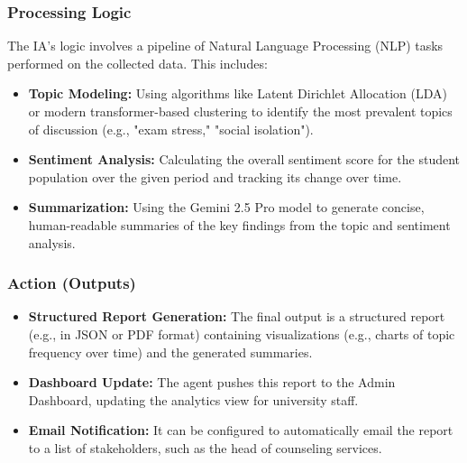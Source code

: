 \subsubsection{Processing Logic}
The IA's logic involves a pipeline of Natural Language Processing (NLP) tasks performed on the collected data. This includes:
\begin{itemize}
    \item \textbf{Topic Modeling:} Using algorithms like Latent Dirichlet Allocation (LDA) or modern transformer-based clustering to identify the most prevalent topics of discussion (e.g., "exam stress," "social isolation").
    \item \textbf{Sentiment Analysis:} Calculating the overall sentiment score for the student population over the given period and tracking its change over time.
    \item \textbf{Summarization:} Using the Gemini 2.5 Pro model to generate concise, human-readable summaries of the key findings from the topic and sentiment analysis.
\end{itemize}

\subsubsection{Action (Outputs)}
\begin{itemize}
    \item \textbf{Structured Report Generation:} The final output is a structured report (e.g., in JSON or PDF format) containing visualizations (e.g., charts of topic frequency over time) and the generated summaries.
    \item \textbf{Dashboard Update:} The agent pushes this report to the Admin Dashboard, updating the analytics view for university staff.
    \item \textbf{Email Notification:} It can be configured to automatically email the report to a list of stakeholders, such as the head of counseling services.
\end{itemize}

